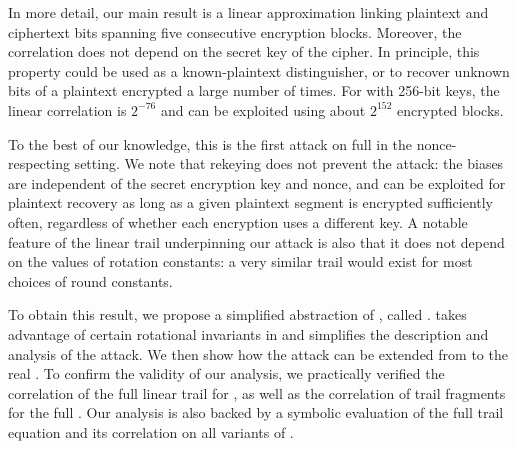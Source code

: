 In more detail, our main result is a linear approximation \cite{eurocryptMatsui93,eurocryptMatsuiY92} linking plaintext and ciphertext bits spanning five consecutive encryption blocks.
Moreover, the correlation does not depend on the secret key of the cipher.
In principle, this property could be used as a known-plaintext distinguisher, or to recover unknown bits of a plaintext encrypted a large number of times.
For \MORUS[1280] with 256-bit keys, the linear correlation is $2^{-76}$
and can be exploited using about $2^{152}$ encrypted blocks.

To the best of our knowledge, this is the first attack on full \MORUS in the nonce-respecting setting.
We note that rekeying does not prevent the attack: the biases are independent of the secret encryption key and nonce, and can be exploited for plaintext recovery as long as a given plaintext segment is encrypted sufficiently often, regardless of whether each encryption uses a different key.
A notable feature of the linear trail underpinning our attack is also that it does not depend on the values of rotation constants: a very similar trail would exist for most choices of round constants.

To obtain this result, we propose a simplified abstraction of \MORUS, called \MiniMORUS. \MiniMORUS takes advantage of certain rotational invariants in \MORUS and simplifies the description and analysis of the attack. We then show how the attack can be extended from \MiniMORUS to the real \MORUS.
To confirm the validity of our analysis,
we practically verified the correlation of the full linear trail for \MiniMORUS, as well as the correlation of trail fragments for the full \MORUS.
Our analysis is also backed by a symbolic evaluation of the full trail equation and its correlation on all variants of \MORUS.

